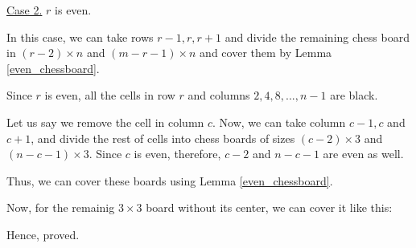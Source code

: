 \begin{solution}[b]
	\bigbreak
	\underline{Case 2.} $r$ is even.

	In this case, we can take rows $r-1, r, r+1$ 
	and divide the remaining chess board in $(r-2) \times n$ and $(m-r-1) \times n$ 
	and cover them by Lemma \ref{even_chessboard}.

	Since $r$ is even, all the cells in row $r$ and columns $2, 4, 8, ..., n-1$ are black.
	
	Let us say we remove the cell in column $c$. Now, we can take column $c-1, c$ and $c+1$, 
	and divide the rest of cells into chess boards of sizes $(c-2)\times 3$ and $(n-c-1) \times 3$. Since $c$ is even, therefore, $c-2$ and $n-c-1$ are even as well.
	
	Thus, we can cover these boards using Lemma \ref{even_chessboard}.

	Now, for the remainig $3 \times 3$ board without its center, we can cover it like this:
	\bigbreak


		Hence, proved.

\end{solution}

